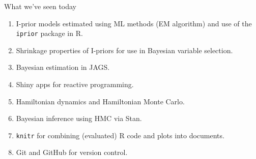 \documentclass{beamer}\usepackage[]{graphicx}\usepackage[]{color}
\begin{document}
\begin{frame}{What we've seen today}
	\begin{enumerate}[1]
		\item I-prior models estimated using ML methods (EM algorithm) and use of the \texttt{iprior} package in R.
		\item Shrinkage properties of I-priors for use in Bayesian variable selection.
		\item Bayesian estimation in JAGS.
		\item Shiny apps for reactive programming.
		\item Hamiltonian dynamics and Hamiltonian Monte Carlo.
		\item Bayesian inference using HMC via Stan.
		\item \texttt{knitr} for combining (evaluated) R code and plots into documents.
		\item Git and GitHub for version control.
	\end{enumerate}
\end{frame}
\end{document}
